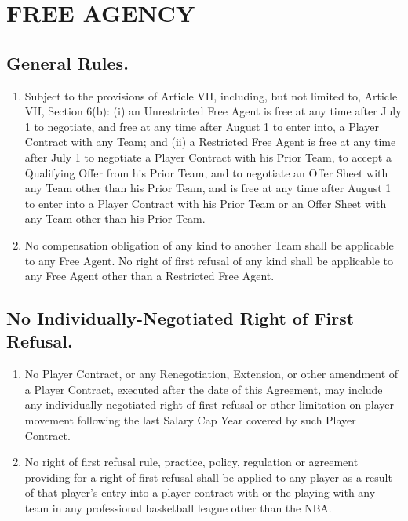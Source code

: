 \documentclass[
]{book}
\providecommand{\tightlist}{%
  \setlength{\itemsep}{0pt}\setlength{\parskip}{0pt}}
\begin{document}
\hypertarget{free-agency}{%
\chapter{FREE AGENCY}\label{free-agency}}

\hypertarget{general-rules.}{%
\section{General Rules.}\label{general-rules.}}

\begin{enumerate}
\def\labelenumi{(\alph{enumi})}
\tightlist
\item
  Subject to the provisions of Article VII, including, but not limited to, Article VII, Section 6(b): (i) an Unrestricted Free Agent is free at any time after July 1 to negotiate, and free at any time after August 1 to enter into, a Player Contract with any Team; and (ii) a Restricted Free Agent is free at any time after July 1 to negotiate a Player Contract with his Prior Team, to accept a Qualifying Offer from his Prior Team, and to negotiate an Offer Sheet with any Team other than his Prior Team, and is free at any time after August 1 to enter into a Player Contract with his Prior Team or an Offer Sheet with any Team other than his Prior Team.
\item
  No compensation obligation of any kind to another Team shall be applicable to any Free Agent. No right of first refusal of any kind shall be applicable to any Free Agent other than a Restricted Free Agent.
\end{enumerate}

\hypertarget{no-individually-negotiated-right-of-first-refusal.}{%
\section{No Individually-Negotiated Right of First Refusal.}\label{no-individually-negotiated-right-of-first-refusal.}}

\begin{enumerate}
\def\labelenumi{(\alph{enumi})}
\tightlist
\item
  No Player Contract, or any Renegotiation, Extension, or other amendment of a Player Contract, executed after the date of this Agreement, may include any individually negotiated right of first refusal or other limitation on player movement following the last Salary Cap Year covered by such Player Contract.
\item
  No right of first refusal rule, practice, policy, regulation or agreement providing for a right of first refusal shall be applied to any player as a result of that player's entry into a player contract with or the playing with any team in any professional basketball league other than the NBA.
\end{enumerate}
\end{document}
